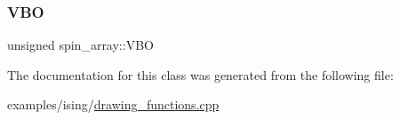 \subsubsection{\texorpdfstring{V\+BO}{VBO}}
{\footnotesize\ttfamily unsigned spin\+\_\+array\+::\+V\+BO\hspace{0.3cm}{\ttfamily [private]}}



The documentation for this class was generated from the following file\+:\begin{DoxyCompactItemize}
\item 
examples/ising/\mbox{\hyperlink{drawing__functions_8cpp}{drawing\+\_\+functions.\+cpp}}\end{DoxyCompactItemize}
